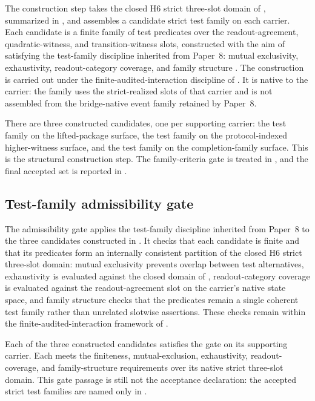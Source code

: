 \documentclass[11pt]{article}
\newcommand{\NewLayer}{H6}
\newcommand{\PaperEight}{Paper~8}
\theoremstyle{definition}
\begin{document}
The construction step takes the closed \NewLayer{} strict three-slot domain of
, summarized in
, and assembles a candidate strict test family on
each carrier.  Each candidate is a finite family of test predicates over the
readout-agreement, quadratic-witness, and transition-witness slots, constructed
with the aim of satisfying the test-family discipline inherited from
\PaperEight{}: mutual exclusivity, exhaustivity, readout-category coverage, and
family structure \cite{Tsiokos2026CarrierToEvent}.  The construction is carried
out under the finite-audited-interaction discipline of
\cite{Tsiokos2026FoundationsII}.  It is native to the carrier: the family uses
the strict-realized slots of that carrier and is not assembled from the
bridge-native event family retained by \PaperEight{}.

There are three constructed candidates, one per supporting carrier: the test
family on the lifted-package surface, the test family on the protocol-indexed
higher-witness surface, and the test family on the completion-family surface.
This is the structural construction step.  The family-criteria gate is treated
in , and the final accepted set is reported
in .

\subsection{Test-family admissibility gate}\label{subsec:family-criteria-gate}

The admissibility gate applies the test-family discipline inherited from
\PaperEight{} to the three candidates constructed in
 \cite{Tsiokos2026CarrierToEvent}.
It checks that each candidate is finite and that its predicates form an
internally consistent partition of the closed \NewLayer{} strict three-slot
domain: mutual exclusivity prevents overlap between test alternatives,
exhaustivity is evaluated against the closed domain of
, readout-category
coverage is evaluated against the readout-agreement slot on the carrier's
native state space, and family structure checks that the predicates remain a
single coherent test family rather than unrelated slotwise assertions.  These
checks remain within the finite-audited-interaction framework of
\cite{Tsiokos2026FoundationsII}.

Each of the three constructed candidates satisfies the gate on its supporting
carrier.  Each meets the finiteness, mutual-exclusion, exhaustivity,
readout-coverage, and family-structure requirements over its native strict
three-slot domain.  This gate passage is still not the acceptance declaration:
the accepted strict test families are named only in
.
\end{document}

